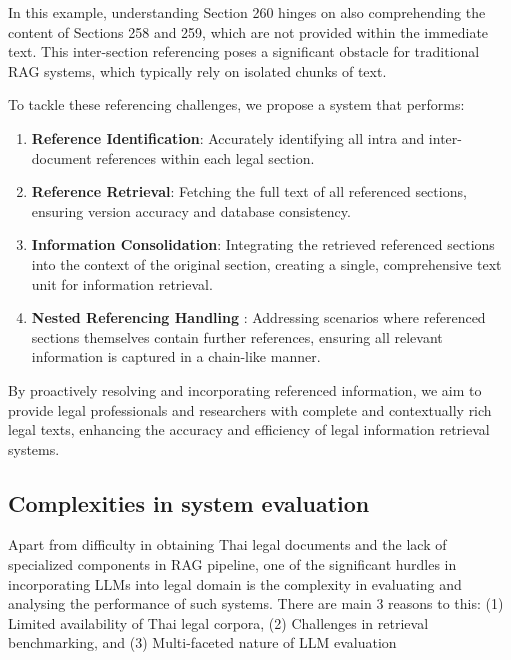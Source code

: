 In this example, understanding Section 260 hinges on also comprehending the content of Sections 258 and 259, which are not provided within the immediate text. This inter-section referencing poses a significant obstacle for traditional RAG systems, which typically rely on isolated chunks of text.

To tackle these referencing challenges, we propose a system that performs:
\begin{enumerate}
    \item \textbf{Reference Identification}: Accurately identifying all intra and inter-document references within each legal section.
    \item \textbf{Reference Retrieval}: Fetching the full text of all referenced sections, ensuring version accuracy and database consistency.
    \item \textbf{Information Consolidation}: Integrating the retrieved referenced sections into the context of the original section, creating a single, comprehensive text unit for information retrieval.
    \item \textbf{Nested Referencing Handling }: Addressing scenarios where referenced sections themselves contain further references, ensuring all relevant information is captured in a chain-like manner.
\end{enumerate}

By proactively resolving and incorporating referenced information, we aim to provide legal professionals and researchers with complete and contextually rich legal texts, enhancing the accuracy and efficiency of legal information retrieval systems.


\subsection{Complexities in system evaluation}

Apart from difficulty in obtaining Thai legal documents and the lack of specialized components in RAG pipeline, one of the significant hurdles in incorporating LLMs into legal domain is the complexity in evaluating and analysing the performance of such systems. There are main 3 reasons to this: (1) Limited availability of Thai legal corpora, (2) Challenges in retrieval benchmarking, and (3) Multi-faceted nature of LLM evaluation


